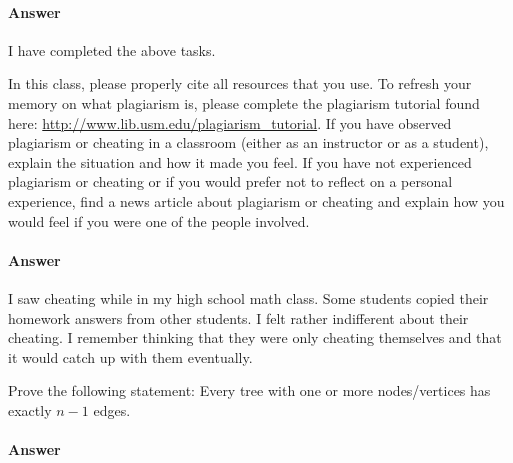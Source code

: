 \documentclass{article}
\begin{document}
\paragraph{Answer}


I have completed the above tasks.



\nextprob
\collab{}

    In this class,
    please properly cite all resources that you use.
    To refresh your memory on what plagiarism is,
    please
    complete the plagiarism tutorial found here:
    \url{http://www.lib.usm.edu/plagiarism_tutorial}.
    If you have observed plagiarism or cheating in a classroom (either as an
    instructor or as a student), explain the situation and how it made you
    feel.  If you have not experienced plagiarism or cheating or if you would
    prefer not to reflect on a personal experience, find a news
    article about plagiarism or cheating and explain how you would feel if you
    were one of the people involved.

\paragraph{Answer}


I saw cheating while in my high school math class.
Some students copied their homework answers from other students.
I felt rather indifferent about their cheating.
I remember thinking that they were only cheating themselves and that it would catch up with them eventually.




\nextprob
Prove the following statement: Every tree with one or more nodes/vertices has
exactly $n-1$ edges.

\paragraph{Answer}

\end{document}
